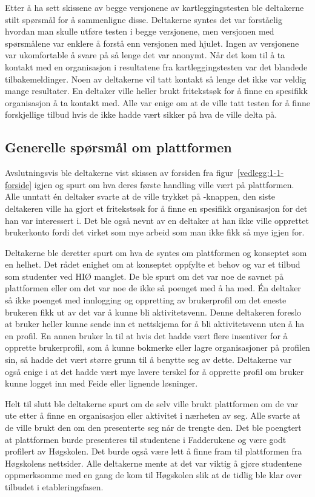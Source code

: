 Etter å ha sett skissene av begge versjonene av kartleggingstesten ble deltakerne stilt spørsmål for å sammenligne disse. Deltakerne syntes det var forståelig hvordan man skulle utføre testen i begge versjonene, men versjonen med spørsmålene var enklere å forstå enn versjonen med hjulet. Ingen av versjonene var ukomfortable å svare på så lenge det var anonymt. Når det kom til å ta kontakt med en organisasjon i resultatene fra kartleggingstesten var det blandede tilbakemeldinger. Noen av deltakerne vil tatt kontakt så lenge det ikke var veldig mange resultater. En deltaker ville heller brukt fritekstsøk for å finne en spesifikk organisasjon å ta kontakt med. Alle var enige om at de ville tatt testen for å finne forskjellige tilbud hvis de ikke hadde vært sikker på hva de ville delta på.

\subsection{Generelle spørsmål om plattformen}

Avslutningsvis ble deltakerne vist skissen av forsiden fra figur~\ref{vedlegg:1-1-forside} igjen og spurt om hva deres første handling ville vært på plattformen. Alle unntatt én deltaker svarte at de ville trykket på -knappen, den siste deltakeren ville ha gjort et fritekstsøk for å finne en spesifikk organisasjon for det han var interessert i. Det ble også nevnt av en deltaker at han ikke ville opprettet brukerkonto fordi det virket som mye arbeid som man ikke fikk så mye igjen for.

Deltakerne ble deretter spurt om hva de syntes om plattformen og konseptet som en helhet. Det rådet enighet om at konseptet oppfylte et behov og var et tilbud som studenter ved HIØ manglet. De ble spurt om det var noe de savnet på plattformen eller om det var noe de ikke så poenget med å ha med. Én deltaker så ikke poenget med innlogging og oppretting av brukerprofil om det eneste brukeren fikk ut av det var å kunne bli aktivitetsvenn. Denne deltakeren foreslo at bruker heller kunne sende inn et nettskjema for å bli aktivitetsvenn uten å ha en profil. En annen bruker la til at hvis det hadde vært flere insentiver for å opprette brukerprofil, som å kunne bokmerke eller lagre organisasjoner på profilen sin, så hadde det vært større grunn til å benytte seg av dette. Deltakerne var også enige i at det hadde vært mye lavere terskel for å opprette profil om bruker kunne logget inn med Feide eller lignende løsninger.

Helt til slutt ble deltakerne spurt om de selv ville brukt plattformen om de var ute etter å finne en organisasjon eller aktivitet i nærheten av seg. Alle svarte at de ville brukt den om den presenterte seg når de trengte den. Det ble poengtert at plattformen burde presenteres til studentene i Fadderukene og være godt profilert av Høgskolen. Det burde også være lett å finne fram til plattformen fra Høgskolens nettsider. Alle deltakerne mente at det var viktig å gjøre studentene oppmerksomme med en gang de kom til Høgskolen slik at de tidlig ble klar over tilbudet i etableringsfasen.

